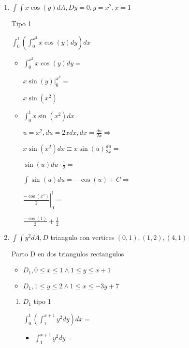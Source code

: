 \documentclass[../practica_08.tex]{subfiles}
\begin{document}
    \begin{enumerate}
        \item $\int \int x\cos(y) dA, D y=0, y=x^2, x =1$
    
            Tipo 1

            $\int_0^1 (\int_0^{x^2} x\cos(y) dy) dx$

            \begin{itemize}
                \item $\int_0^{x^2} x\cos(y) dy = $
                
                    $ \left. x\sin(y)  \right |_0^{x^2} = $

                    $ x\sin(x^2) $

                \item $\int_0^1 x\sin(x^2) dx$
                
                    $u = x^2, du = 2x dx, dx = \frac{du}{2x} \Rightarrow$

                    $ x\sin(x^2) dx \equiv x\sin(u) \frac{du}{2x} =$

                    $ \sin(u) du \cdot \frac{1}{2} =  $

                    $ \int \sin(u) du = -\cos(u) + C \Rightarrow$

                    $ \left. \frac{-\cos(x^2)}{2} \right |_0^1 = $

                    $ \frac{-\cos(1)}{2} + \frac{1}{2} $

            \end{itemize}

        \item  $\int \int y^2 dA, D$ triangulo con vertices $(0,1),(1,2),(4,1)$
        
            Parto D en dos triangulos rectangulos 
                \begin{itemize}
                    \item $D_1, 0\leq x \leq 1 \wedge 1\leq y\leq x+1$
                    \item $D_1, 1\leq y\leq 2 \wedge 1\leq x\leq -3y +7 $
                \end{itemize}
            
            \begin{enumerate}
                \item $D_1$ tipo 1
                
                    $\int_0^1 (\int_1^{x+1} y^2 dy ) dx  = $

                    \begin{itemize}
                        \item $\int_1^{x+1} y^2 dy = $
                        

\end{itemize}
\end{enumerate}
\end{enumerate}
\end{document}
